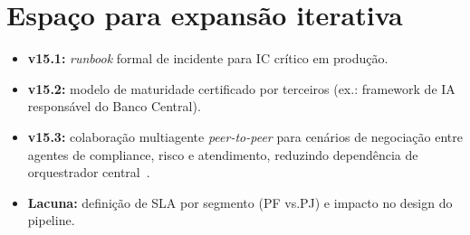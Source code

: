 \section{Espa\c{c}o para expans\~ao iterativa}

\begin{itemize}[leftmargin=*]
  \item \textbf{v15.1:} \textit{runbook} formal de incidente para IC
        cr\'itico em produ\c{c}\~ao.
  \item \textbf{v15.2:} modelo de maturidade certificado por terceiros
        (ex.: framework de IA respons\'avel do Banco Central).
  \item \textbf{v15.3:} colabora\c{c}\~ao multiagente \textit{peer-to-peer}
        para cen\'arios de negocia\c{c}\~ao entre agentes de compliance,
        risco e atendimento, reduzindo depend\^encia de orquestrador central~\cite{awsagentic2025}.
  \item \textbf{Lacuna:} defini\c{c}\~ao de SLA por segmento (PF vs.\@ PJ)
        e impacto no design do pipeline.
\end{itemize}
